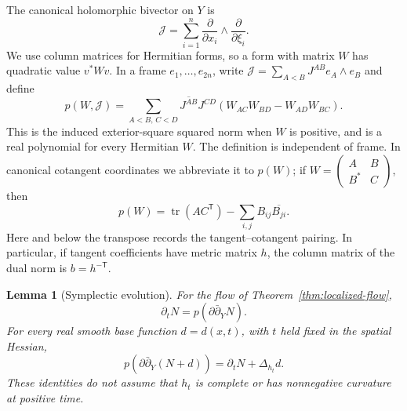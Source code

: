 \documentclass[11pt]{article}
\newtheorem{lemma}[theorem]{Lemma}
\theoremstyle{definition}
\theoremstyle{remark}
\newcommand{\dd}{\partial\bar\partial}
\DeclareMathOperator{\tr}{tr}
\numberwithin{equation}{section}
\begin{document}
The canonical holomorphic bivector on $Y$ is
\[
 \mathcal J=\sum_{i=1}^n
       \frac{\partial}{\partial x_i}\wedge
       \frac{\partial}{\partial\xi_i}.
\]
We use column matrices for Hermitian forms, so a form with matrix $W$
has quadratic value $v^*Wv$.  In a frame $e_1,\ldots,e_{2n}$, write
$\mathcal J=\sum_{A<B}J^{AB}e_A\wedge e_B$ and define
\begin{equation}\label{disc:p-definition}
 p(W,\mathcal J)=
 \sum_{A<B,\,C<D}\overline{J^{AB}}J^{CD}
       (W_{AC}W_{BD}-W_{AD}W_{BC}).
\end{equation}
This is the induced exterior-square squared norm when $W$ is positive,
and is a real polynomial for every Hermitian $W$.  The definition is
independent of frame.  In canonical cotangent coordinates we abbreviate
it to $p(W)$; if
$W=\left(\begin{smallmatrix}A&B\\B^*&C\end{smallmatrix}\right)$, then
\begin{equation}\label{disc:p-block}
 p(W)=\tr(AC^{\mathsf T})-
                 \sum_{i,j}B_{ij}\overline{B_{ji}}.
\end{equation}
Here and below the transpose records the tangent--cotangent pairing.
In particular, if tangent coefficients have metric matrix $h$, the
column matrix of the dual norm is $b=h^{-\mathsf T}$.

\begin{lemma}[Symplectic evolution]\label{lem:symplectic-evolution}
For the flow of Theorem~\ref{thm:localized-flow},
\begin{equation}\label{disc:symplectic-evolution}
 \partial_tN=p(\dd_YN).
\end{equation}
For every real smooth base function $d=d(x,t)$, with $t$ held fixed in
the spatial Hessian,
\begin{equation}\label{disc:base-addition}
 p(\dd_Y(N+d))=\partial_tN+\Delta_{h_t}d.
\end{equation}
These identities do not assume that $h_t$ is complete or has
nonnegative curvature at positive time.
\end{lemma}
\end{document}
